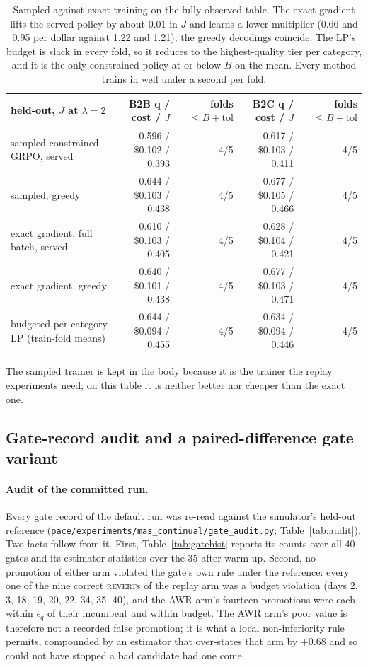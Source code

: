 \documentclass[10pt]{article}
\newcommand{\code}[1]{\texttt{#1}}
\newcommand{\REVERT}{\textsc{revert}}
\begin{document}
\begin{table}[H]\centering\small
\begin{tabular}{lrrrr}\toprule
held-out, $J$ at $\lambda=2$ & B2B q / cost / $J$ & folds $\le B{+}\mathrm{tol}$ & B2C q / cost / $J$ & folds $\le B{+}\mathrm{tol}$ \\\midrule
sampled constrained GRPO, served & 0.596 / \$0.102 / 0.393 & 4/5 & 0.617 / \$0.103 / 0.411 & 4/5 \\
sampled, greedy & 0.644 / \$0.103 / 0.438 & 4/5 & 0.677 / \$0.105 / 0.466 & 4/5 \\
exact gradient, full batch, served & 0.610 / \$0.103 / 0.405 & 4/5 & 0.628 / \$0.104 / 0.421 & 4/5 \\
exact gradient, greedy & 0.640 / \$0.101 / 0.438 & 4/5 & 0.677 / \$0.103 / 0.471 & 4/5 \\
budgeted per-category LP (train-fold means) & 0.644 / \$0.094 / 0.455 & 4/5 & 0.634 / \$0.094 / 0.446 & 4/5 \\\bottomrule
\end{tabular}
\caption{Sampled against exact training on the fully observed table. The exact gradient lifts the served policy by about 0.01 in $J$ and learns a lower multiplier (0.66 and 0.95 per dollar against 1.22 and 1.21); the greedy decodings coincide. The LP's budget is slack in every fold, so it reduces to the highest-quality tier per category, and it is the only constrained policy at or below $B$ on the mean. Every method trains in well under a second per fold.}
\label{tab:exact}
\end{table}

The sampled trainer is kept in the body because it is the trainer the replay experiments need; on this table it is neither better nor cheaper than the exact one.

\subsection{Gate-record audit and a paired-difference gate variant}
\label{app:gateaudit}

\paragraph{Audit of the committed run.} Every gate record of the default run was re-read against the simulator's held-out reference (\code{pace/experiments/mas\_continual/gate\_audit.py}; Table~\ref{tab:audit}). Two facts follow from it. First, Table~\ref{tab:gatehist} reports its counts over all 40 gates and its estimator statistics over the 35 after warm-up. Second, no promotion of either arm violated the gate's own rule under the reference: every one of the nine correct \REVERT{}s of the replay arm was a budget violation (days 2, 3, 18, 19, 20, 22, 34, 35, 40), and the AWR arm's fourteen promotions were each within $\epsilon_q$ of their incumbent and within budget. The AWR arm's poor value is therefore not a recorded false promotion; it is what a local non-inferiority rule permits, compounded by an estimator that over-states that arm by $+0.68$ and so could not have stopped a bad candidate had one come.
\end{document}
